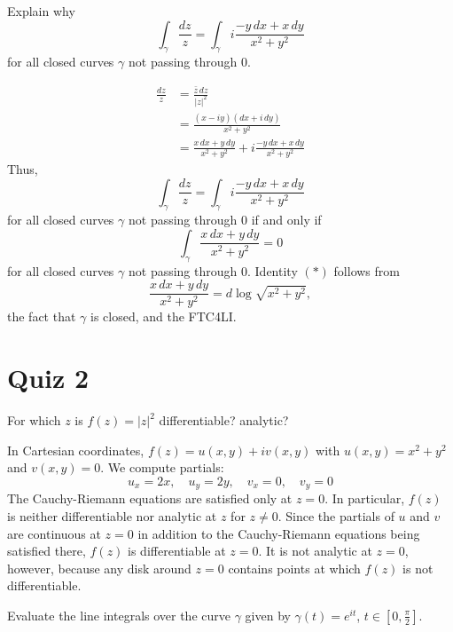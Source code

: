 \documentclass[12pt, answers]{exam}
\begin{document}
\begin{questions}
\question
Explain why
\[
    \int_\gamma \frac{dz}{z} = \int_\gamma i\frac{-y\,dx + x\,dy}{x^2+y^2}
\]
for all closed curves $\gamma$ not passing through $0$.

\begin{solution}
\begin{align*}
    \frac{dz}z &= \frac{\bar z\,dz}{|z|^2}\\
    &= \frac{(x-iy)(dx + i\,dy)}{x^2+y^2}\\
    &= \frac{x\,dx + y\,dy}{x^2+y^2} + i\frac{-y\,dx + x\,dy}{x^2+y^2}
\end{align*}
Thus,
\[
    \int_\gamma \frac{dz}{z} = \int_\gamma i\frac{-y\,dx + x\,dy}{x^2+y^2}
\]
for all closed curves $\gamma$ not passing through $0$ if and only if
\[
    \int_\gamma\frac{x\,dx + y\,dy}{x^2+y^2}=0\tag{$*$}
\]
for all closed curves $\gamma$ not passing through $0$. Identity $(*)$ follows from
\[
    \frac{x\,dx + y\,dy}{x^2+y^2} = d\log\sqrt{x^2+y^2},
\]
the fact that $\gamma$ is closed, and the FTC4LI.
\end{solution}


    \section*{Quiz 2}

    \question For which $z$ is $f(z) = |z|^2$ differentiable? analytic?

    \begin{solution}
        In Cartesian coordinates, $f(z) = u(x,y) + iv(x,y)$ with $u(x,y)=x^2+y^2$ and $v(x,y)=0$.
        We compute partials:
        \[
            u_x = 2x,\quad u_y = 2y,\quad v_x=0,\quad v_y=0
        \]
        The Cauchy-Riemann equations are satisfied only at $z=0$. In particular, $f(z)$ is neither differentiable nor analytic at $z$ for $z\neq 0$.
        Since the partials of $u$ and $v$ are continuous at $z=0$ in addition to the Cauchy-Riemann equations being satisfied there, $f(z)$ is differentiable at $z=0$.
        It is not analytic at $z=0$, however, because any disk around $z=0$ contains points at which $f(z)$ is not differentiable.
    \end{solution}

    \question Evaluate the line integrals over the curve $\gamma$ given by $\gamma(t) = e^{it}$, $t\in [0,\frac\pi2]$.
\end{questions}
\end{document}
